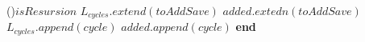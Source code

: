 \begin{algorithm}
{                    \eIf(){$isResursion$}
                    {
                    }
                    {
                        $L_{cycles}.extend(toAddSave)$\;
                        $added.extedn(toAddSave)$\;
                        {
                            {
                                $L_{cycles}.append(cycle)$\;
                                $added.append(cycle)$\;
                            }
                        }
                    }
                }{\textbf{end}}
            \vspace*{0.5em}

        \end{algorithm}

        \newpage

